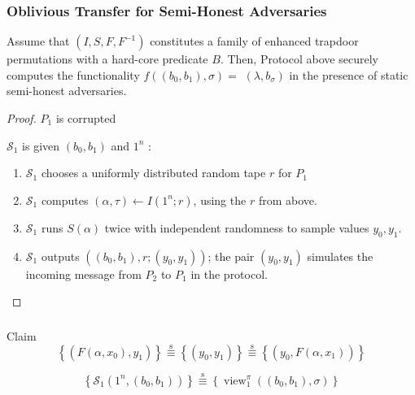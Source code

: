 \documentclass{beamer}
\begin{document}
    \begin{frame}
        \frametitle{Oblivious Transfer for Semi-Honest Adversaries}
    
        \begin{theorem}
            Assume that $\left(I, S, F, F^{-1}\right)$ constitutes a family of enhanced trapdoor permutations with a hard-core predicate $B.$ Then, Protocol above securely computes the functionality $f\left(\left(b_{0}, b_{1}\right), \sigma\right)=$ $\left(\lambda, b_{\sigma}\right)$ in the presence of static semi-honest adversaries.
        \end{theorem}

        \begin{proof}
            $P_{1}$ is corrupted

            $\mathcal{S}_{1}$ is given $\left(b_{0}, b_{1}\right)$ and $1^{n}$ :
            \begin{enumerate}
                \item $\mathcal{S}_{1}$ chooses a uniformly distributed random tape $r$ for $P_{1}$ 
                \item $\mathcal{S}_{1}$ computes $(\alpha, \tau) \leftarrow I\left(1^{n} ; r\right)$, using the $r$ from above.
                \item $\mathcal{S}_{1}$ runs $S(\alpha)$ twice with independent randomness to sample values $y_{0}, y_{1}$.
                \item $\mathcal{S}_{1}$ outputs $\left(\left(b_{0}, b_{1}\right), r ;\left(y_{0}, y_{1}\right)\right)$; the pair $\left(y_{0}, y_{1}\right)$ simulates the incoming message from $P_{2}$ to $P_{1}$ in the protocol.
            \end{enumerate}
        \end{proof}
    
    \end{frame}

    \begin{frame}
        \frametitle{}
    
        \begin{block}{Claim}
            $$
            \left\{\left(F\left(\alpha, x_{0}\right), y_{1}\right)\right\} \stackrel{\mathrm{s}}{\equiv}\left\{\left(y_{0}, y_{1}\right)\right\} \stackrel{\mathrm{s}}{\equiv}\left\{\left(y_{0}, F\left(\alpha, x_{1}\right)\right)\right\}
            $$

            $$
            \left\{\mathcal{S}_{1}\left(1^{n},\left(b_{0}, b_{1}\right)\right)\right\} \stackrel{\mathrm{s}}{\equiv} \left\{\operatorname{view}_{1}^{\pi}\left(\left(b_{0}, b_{1}\right), \sigma\right)\right\}
            $$
            
        \end{block}
    
    \end{frame}
\end{document}
